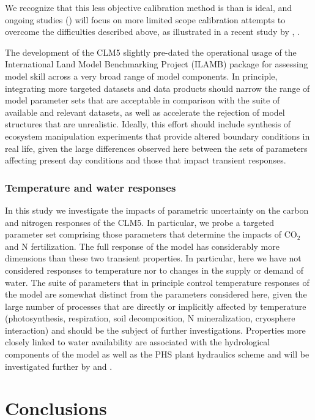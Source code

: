 \documentclass[draft,linenumbers]{agujournal}
\begin{document}
We recognize that this less objective calibration method is than is ideal, and ongoing studies (\cite{dagon}) will focus on more limited scope calibration attempts to overcome the difficulties described above, as illustrated in a recent study by \cite{fer2018}, .  

The development of the CLM5 slightly pre-dated the operational usage of the International Land Model Benchmarking Project (ILAMB) package \cite{collier2016} for assessing model skill across a very broad range of model components.  In principle, integrating more targeted datasets and data products should narrow the range of model parameter sets that are acceptable in comparison with the suite of available and relevant datasets, as well as accelerate the rejection of model structures that are unrealistic. Ideally, this effort should include synthesis of ecosystem manipulation experiments that provide altered boundary conditions in real life, given the large differences observed here between the sets of parameters affecting present day conditions and those that impact transient responses.

\subsubsection{Temperature and water responses}
In this study we investigate the impacts of parametric uncertainty on the carbon and nitrogen responses of the CLM5. In particular, we probe a targeted parameter set comprising those parameters that determine the impacts of CO$_{2}$ and N fertilization. The full response of the model has considerably more dimensions than these two transient properties. In particular, here we have not considered responses to temperature nor to changes in the supply or demand of water. The suite of parameters that in principle control temperature responses of the model are somewhat distinct from the parameters considered here, given the large number of processes that are directly or implicitly affected by temperature (photosynthesis, respiration, soil decomposition, N mineralization, cryosphere interaction) and should be the subject of further investigations. Properties more closely linked to water availability are associated with the hydrological components of the model as well as the PHS plant hydraulics scheme and will be investigated further by \cite{dagon} and \cite{kennedy}. 


\section{Conclusions}
\end{document}

